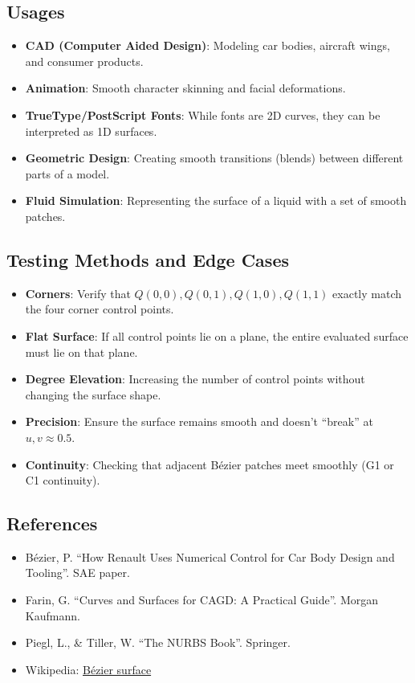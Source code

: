\subsection{Usages}
\begin{itemize}
\item \textbf{CAD (Computer Aided Design)}: Modeling car bodies, aircraft wings, and consumer products.
\item \textbf{Animation}: Smooth character skinning and facial deformations.
\item \textbf{TrueType/PostScript Fonts}: While fonts are 2D curves, they can be interpreted as 1D surfaces.
\item \textbf{Geometric Design}: Creating smooth transitions (blends) between different parts of a model.
\item \textbf{Fluid Simulation}: Representing the surface of a liquid with a set of smooth patches.
\end{itemize}

\subsection{Testing Methods and Edge Cases}
\begin{itemize}
\item \textbf{Corners}: Verify that $Q(0,0), Q(0,1), Q(1,0), Q(1,1)$ exactly match the four corner control points.
\item \textbf{Flat Surface}: If all control points lie on a plane, the entire evaluated surface must lie on that plane.
\item \textbf{Degree Elevation}: Increasing the number of control points without changing the surface shape.
\item \textbf{Precision}: Ensure the surface remains smooth and doesn't ``break'' at $u, v \approx 0.5$.
\item \textbf{Continuity}: Checking that adjacent B\'ezier patches meet smoothly (G1 or C1 continuity).
\end{itemize}

\subsection{References}
\begin{itemize}
\item B\'ezier, P. \cite{bezier1968} ``How Renault Uses Numerical Control for Car Body Design and Tooling''. SAE paper.
\item Farin, G. \cite{farin2002} ``Curves and Surfaces for CAGD: A Practical Guide''. Morgan Kaufmann.
\item Piegl, L., \& Tiller, W. \cite{piegl1997} ``The NURBS Book''. Springer.
\item Wikipedia: \href{https://en.wikipedia.org/wiki/B\%C3\%A9zier_surface}{B\'ezier surface}
\end{itemize}

